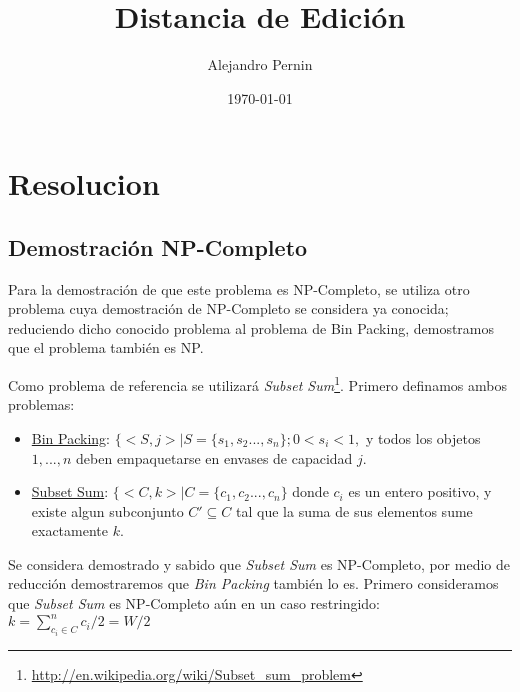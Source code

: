 \documentclass[12pt]{article}
\title{Distancia de Edición}
\author{
        Alejandro Pernin 
}
\date{\today}
\begin{document}


\maketitle

\newpage
\tableofcontents

\newpage



\newpage
\section{Resolucion}
	\subsection{Demostración NP-Completo}
		Para la demostración de que este problema es NP-Completo, se 
		utiliza otro problema cuya demostración de NP-Completo se considera
		ya conocida; reduciendo dicho conocido problema al problema de
		Bin Packing, demostramos que el problema también es NP.
		
		Como problema de referencia se utilizar\'a \emph{Subset Sum}\footnote{\url{http://en.wikipedia.org/wiki/Subset_sum_problem}}.
		Primero definamos ambos problemas:
		\begin{itemize}
			\item \underline{Bin Packing}: $\{ <S,j> | S = \{ s_{1},s_{2}...,s_{n}\}; 0<s_{i}<1,$ 
			y todos los objetos $1,...,n$ deben empaquetarse en envases de capacidad $j$.
			
			\item \underline{Subset Sum}: $\{ <C,k> | C = \{ c_{1},c_{2}...,c_{n}\}$ donde $c_{i}$
			es un entero positivo, y existe algun subconjunto $C'\subseteq C$ tal que la suma de sus
			elementos sume exactamente $k$.
		\end{itemize}
		
		Se considera demostrado y sabido que \emph{Subset Sum} es NP-Completo, 
		por medio de reducción demostraremos que \emph{Bin Packing} también lo es.
		Primero consideramos que \emph{Subset Sum} es NP-Completo aún en un caso restringido:
			\\ 
			
			$k=\sum_{c_{i}\in C}^{n} c_{i}/2 = W/2$
\end{document}
